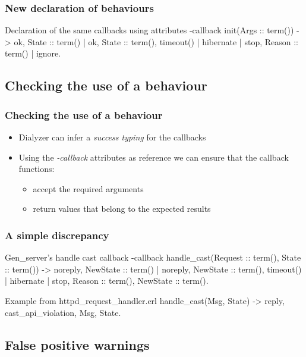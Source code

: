 \documentclass{beamer}
\begin{document}
\begin{frame}[fragile]
  \frametitle{New declaration of behaviours}
\begin{code}{Declaration of the same callbacks using attributes}
-callback init(Args :: term()) ->
    {ok, State :: term()} |
    {ok, State :: term(), timeout() | hibernate} |
    {stop, Reason :: term()} | 
    ignore.

\end{code}
\end{frame}

\subsection{Checking the use of a behaviour}

\begin{frame}
  \frametitle{Checking the use of a behaviour}
  \begin{itemize}
    \item Dialyzer can infer a \emph{success typing} for the callbacks
      \pause
    \item Using the \emph{-callback} attributes as reference we can
      ensure that the callback functions:
      \begin{itemize}
        \item accept the required arguments \pause
        \item return values that belong to the expected results
      \end{itemize}
  \end{itemize}
\end{frame}

\begin{frame}[fragile]
  \frametitle{A simple discrepancy}
\begin{code}{Gen\_server's handle cast callback}
-callback handle_cast(Request :: term(),
                      State :: term()) ->
  {noreply, NewState :: term()} | 
  {noreply, NewState :: term(), timeout() | hibernate} | 
  {stop, Reason :: term(), NewState :: term()}.
\end{code}
\begin{code}{Example from httpd\_request\_handler.erl}
handle_cast(Msg, State) ->
    {reply, {cast_api_violation, Msg}, State}.
\end{code}
\end{frame}

\subsection{False positive warnings}
\end{document}
